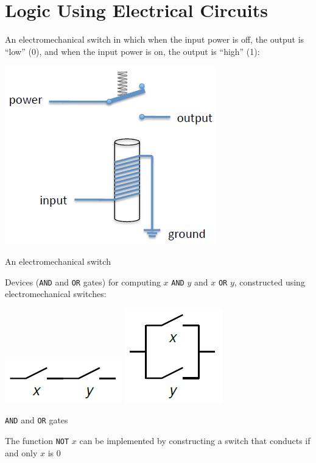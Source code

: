 \documentclass[8pt,a4paper,compress]{beamer}
\begin{document}
\section{Logic Using Electrical Circuits}
\begin{frame}[fragile]
An electromechanical switch in which when the input power is off, the output is ``low'' (0), and when the input power is on, the output is ``high'' (1):
\begin{center}
\includegraphics[scale=0.22]{figures/em_switch.png}

\smallskip

\tiny An electromechanical switch
\end{center}

\bigskip

Devices (\lstinline{AND} and \lstinline{OR} gates) for computing $x$ \lstinline{AND} $y$ and $x$ \lstinline{OR} $y$, constructed using electromechanical switches:
\begin{center}
\includegraphics[scale=0.22]{figures/and_gate.png}\hspace{1cm} \includegraphics[scale=0.22]{figures/or_gate.png}

\smallskip

\tiny \lstinline{AND} and \lstinline{OR} gates
\end{center}

\bigskip

The function \lstinline{NOT} $x$ can be implemented by constructing a switch that conducts if and only $x$ is 0
\end{frame}
\end{document}
